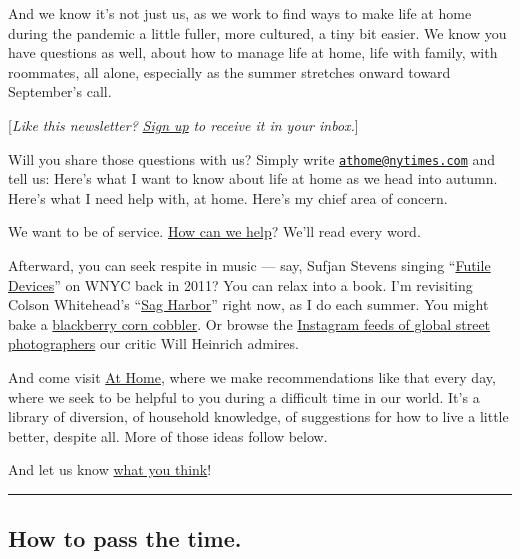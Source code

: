 And we know it's not just us, as we work to find ways to make life at
home during the pandemic a little fuller, more cultured, a tiny bit
easier. We know you have questions as well, about how to manage life at
home, life with family, with roommates, all alone, especially as the
summer stretches onward toward September's call.

{[}\emph{Like this newsletter?}
\href{https://www.nytimes.com/newsletters/at-home}{\emph{Sign up}}
\emph{to receive it in your inbox.}{]}

Will you share those questions with us? Simply write
\href{mailto:athome@nytimes.com}{\nolinkurl{athome@nytimes.com}} and
tell us: Here's what I want to know about life at home as we head into
autumn. Here's what I need help with, at home. Here's my chief area of
concern.

We want to be of service. \href{mailto:athome@nytimes.com}{How can we
help}? We'll read every word.

Afterward, you can seek respite in music --- say, Sufjan Stevens singing
``\href{https://www.youtube.com/watch?v=x2dNTjE6ItI}{Futile Devices}''
on WNYC back in 2011? You can relax into a book. I'm revisiting Colson
Whitehead's
``\href{https://www.penguinrandomhouse.com/books/189755/sag-harbor-by-colson-whitehead/}{Sag
Harbor}'' right now, as I do each summer. You might bake a
\href{https://cooking.nytimes.com/recipes/1020329-blackberry-corn-cobbler}{blackberry
corn cobbler}. Or browse the
\href{https://www.nytimes.com/2020/07/15/arts/design/art-accounts-instagram.html}{Instagram
feeds of global street photographers} our critic Will Heinrich admires.

And come visit \href{http://www.nytimes.com/athome}{At Home}, where we
make recommendations like that every day, where we seek to be helpful to
you during a difficult time in our world. It's a library of diversion,
of household knowledge, of suggestions for how to live a little better,
despite all. More of those ideas follow below.

And let us know
\href{https://nyt.qualtrics.com/jfe/form/SV_e9cKGVFtci4CObz}{what you
think}!

\begin{center}\rule{0.5\linewidth}{\linethickness}\end{center}

\hypertarget{how-to-pass-the-time}{%
\subsection{How to pass the time.}\label{how-to-pass-the-time}}

